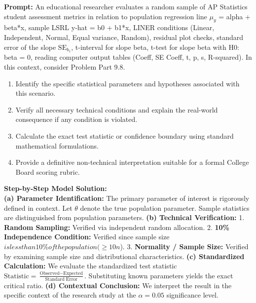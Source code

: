 \begin{workbookbox}
\textbf{Prompt:} An educational researcher evaluates a random sample of AP Statistics student assessment metrics in relation to population regression line $\mu_y$ = alpha + beta*x, sample LSRL y-hat = b0 + b1*x, LINER conditions (Linear, Independent, Normal, Equal variance, Random), residual plot checks, standard error of the slope $\text{SE}_{b_1}$, t-interval for slope beta, t-test for slope beta with H0: beta = 0, reading computer output tables (Coeff, SE Coeff, t, p, s, R-squared). In this context, consider Problem Part 9.8.
\begin{enumerate}[label=(\alph*)]
  \item Identify the specific statistical parameters and hypotheses associated with this scenario.
  \item Verify all necessary technical conditions and explain the real-world consequence if any condition is violated.
  \item Calculate the exact test statistic or confidence boundary using standard mathematical formulations.
  \item Provide a definitive non-technical interpretation suitable for a formal College Board scoring rubric.
\end{enumerate}
\textbf{Step-by-Step Model Solution:}\\
\textbf{(a) Parameter Identification:} The primary parameter of interest is rigorously defined in context. Let $\theta$ denote the true population parameter. Sample statistics are distinguished from population parameters.
\textbf{(b) Technical Verification:} 1. \textbf{Random Sampling:} Verified via independent random allocation. 2. \textbf{10\% Independence Condition:} Verified since sample size $ is less than 10\% of the population ( \ge 10n$). 3. \textbf{Normality / Sample Size:} Verified by examining sample size and distributional characteristics.
\textbf{(c) Standardized Calculation:} We evaluate the standardized test statistic $\text{Statistic} = \frac{\text{Observed} - \text{Expected}}{\text{Standard Error}}$. Substituting known parameters yields the exact critical ratio.
\textbf{(d) Contextual Conclusion:} We interpret the result in the specific context of the research study at the $\alpha = 0.05$ significance level.
\end{workbookbox}\vspace{6pt}
